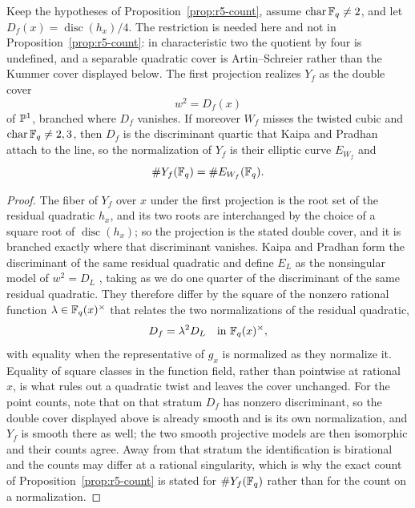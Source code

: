 \begin{proposition}
\label{prop:r5-fibre-is-elliptic}%
%
Keep the hypotheses of Proposition~\ref{prop:r5-count}, assume
$\operatorname{char}\mathbb F_q\neq2$, and let
$D_f(x)=\operatorname{disc}(h_x)/4$.  The restriction is needed here and
not in Proposition~\ref{prop:r5-count}: in characteristic two the
quotient by four is undefined, and a separable quadratic cover is
Artin--Schreier rather than the Kummer cover displayed below.  The first projection realizes
$Y_f$ as the double cover
\[
       w^2=D_f(x)
\]
of $\mathbb P^1$, branched where $D_f$ vanishes.  If moreover $W_f$ misses the
twisted cubic and $\operatorname{char}\mathbb F_q\neq2,3$, then $D_f$ is the
discriminant quartic that Kaipa and Pradhan attach to the line, so the
normalization of $Y_f$ is their elliptic curve $E_{W_f}$ and
\[
       \#Y_f(\mathbb F_q)=\#E_{W_f}(\mathbb F_q).
\]
\end{proposition}

\begin{proof}
The fiber of $Y_f$ over $x$ under the first projection is the root set
of the residual quadratic $h_x$, and its two roots are interchanged by
the choice of a square root of $\operatorname{disc}(h_x)$; so the
projection is the stated double cover, and it is branched exactly where
that discriminant vanishes.  Kaipa and Pradhan form the discriminant of
the same residual quadratic and define $E_L$ as the nonsingular model
of $w^2=D_L$ \cite[\S4--\S5]{KaipaPradhan2025}, taking as we do one quarter
of the discriminant of the same residual quadratic.  They therefore differ by
the square of the nonzero rational function $\lambda\in\mathbb F_q(x)^\times$
that relates the two normalizations of the residual quadratic,
\[
       D_f=\lambda^2D_L\quad\text{in }\mathbb F_q(x)^\times,
\]
with equality when the representative of $g_x$ is normalized as they
normalize it.  Equality of square classes in the function field, rather
than pointwise at rational $x$, is what rules out a quadratic twist and
leaves the cover unchanged.  For the point counts,
note that on that stratum $D_f$ has nonzero discriminant, so the double
cover displayed above is already smooth and is its own normalization,
and $Y_f$ is smooth there as well; the two smooth projective models are
then isomorphic and their counts agree.  Away from that stratum the
identification is birational and the counts may differ at a rational
singularity, which is why the exact count of
Proposition~\ref{prop:r5-count} is stated for $\#Y_f(\mathbb F_q)$ rather than
for the count on a normalization.
\end{proof}

